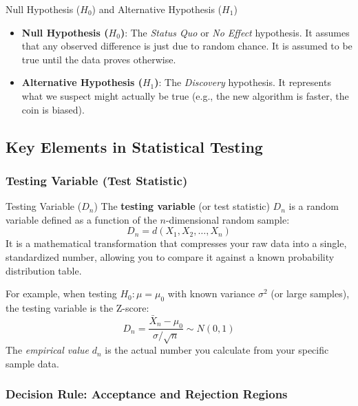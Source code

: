\begin{defbox}{Null Hypothesis ($H_0$) and Alternative Hypothesis ($H_1$)}
 \begin{itemize}
  \item \textbf{Null Hypothesis ($H_0$)}: The \textit{Status Quo} or \textit{No Effect} hypothesis. It assumes that any observed difference is just due to random chance. It is assumed to be true until the data proves otherwise.
  
  \item \textbf{Alternative Hypothesis ($H_1$)}: The \textit{Discovery} hypothesis. It represents what we suspect might actually be true (e.g., the new algorithm is faster, the coin is biased).
 \end{itemize}
\end{defbox}

\subsection{Key Elements in Statistical Testing}

\subsubsection{Testing Variable (Test Statistic)}

\begin{defbox}{Testing Variable ($D_n$)}
 The \textbf{testing variable} (or test statistic) $D_n$ is a random variable defined as a function of the $n$-dimensional random sample:
 \[
  D_n = d(X_1, X_2, \ldots, X_n)
 \]
 It is a mathematical transformation that compresses your raw data into a single, standardized number, allowing you to compare it against a known probability distribution table.
\end{defbox}

For example, when testing $H_0: \mu = \mu_0$ with known variance $\sigma^2$ (or large samples), the testing variable is the Z-score:
\[
 D_n = \frac{\bar{X}_n - \mu_0}{\sigma/\sqrt{n}} \sim N(0,1)
\]
The \textit{empirical value} $d_n$ is the actual number you calculate from your specific sample data.

\subsubsection{Decision Rule: Acceptance and Rejection Regions}

